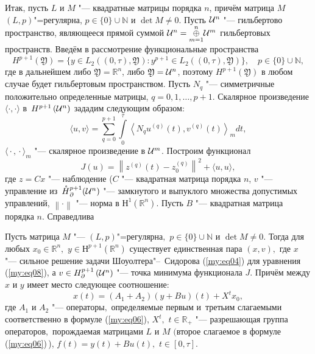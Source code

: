  Итак, пусть $L$ и $M$ "--- квадратные матрицы порядка $n$, причём матрица $M$   $(L,p)$"=регулярна,
$p\in\{0\}\cup{\mathbb N}$ и $\det M\neq 0$. Пусть ${\cal U}^{n}$ "--- гильбертово пространство, являющееся прямой суммой
${\cal U}^{n}=\underset{m=1}{\overset{n}{\oplus}}{\cal U}^{m}$ гильбертовых пространств.
Введём в рассмотрение функциональные пространства
\begin{equation*}
  H^{p+1} \left({\mathfrak Y}\right) = \{ y \in L_{2} \left( \left(0,\tau\right),{\mathfrak Y}\right) :
  y^{p+1} \in L_{2}\left(\left(0,\tau\right),  {\mathfrak Y}\right)\}, \quad p\in\{0\}\cup{\mathbb N},
\end{equation*}
где в дальнейшем либо ${\mathfrak Y}={\mathbb R}^{n}$, либо ${\mathfrak Y}={\cal U}^{n}$, поэтому
$H^{p+1} \left({\mathfrak Y}\right)$ в любом случае будет гильбертовым пространством. 
Пусть $N_{q}$ "--- симметричные положительно определенные матрицы, $q= 0, 1, \ldots , p+1$. 
Скалярное произведение  $\langle \cdot,\cdot\rangle$ в~$H^{p+1} \left({\cal U}^{n} \right)$ зададим следующим образом:
\begin{equation*}
\langle u, v\rangle=\sum\limits^{p+1}_{q=0} \int\limits^{\tau}_{0} \left\langle N_{q} u^{(q)}(t), v^{(q)}(t)\right\rangle_{m} dt,
\end{equation*}
$\langle{}\cdot{}, {}\cdot {}\rangle_{m}$  "--- скалярное произведение в ${\cal U}^{m}$. 
Построим функционал 
\begin{equation*}
J(u)= \left\|z^{(q)}(t) - z^{(q)}_{0}\right\|^{2} + \langle u, u\rangle,
\end{equation*}
где $z=Cx$ "--- наблюдение ($C$ "--- квадратная матрица порядка $n$, $v$ "--- управление из~$\mathring{H}{}^{p+1}_{\partial} ({\cal U}^{n})$ "--- замкнутого и выпуклого множества допустимых управлений,
$\left\| \cdot \right\|$ "--- норма в $Н^{1} \left( {\mathbb R}^{n} \right)$. Пусть $B$ "--- квадратная матрица порядка $n$.
Справедлива 

\smallskip
\hypertarget{svir:th:3}{}
 \begin{theorem}[3]Пусть матрица $M$ "--- $(L,p)$"=регулярна$,$ $p\in\{0\}\cup{\mathbb N}$ и \mbox{$\det M\neq 0$}.
 Тогда для любых $x_{0}\in{\mathbb R}^{n},$  $y \in Н^{p+1} \left( {\mathbb R}^{n} \right)$
 существует единственная пара $(x,v),$ где $x$ "--- сильное решение задачи Шоуолтера"--~Сидорова {\rm(\ref{my:eq04})} для уравнения
 {\rm(\ref{my:eq08}),} а $v\in{H^{p+1}_{\partial}}\left({\cal U}^{n} \right)$ "--- точка минимума функционала $J.$ 
 Причём между  $x$ и $y$ имеет место следующее соотношение:
 \begin{equation*}
 x(t) = \left( A_{1} + A_{2} \right) \left( y+Bu \right) (t) + X^t x_{0},
 \end{equation*}
где $A_{1}$ и $A_{2}$ "--- операторы$,$ определяемые первым и~третьим слагаемыми соответственно в формуле {\rm (\ref{my:eq06}),}
$X^{t}, $ $ t\in{\mathbb R_{+}}$ "--- разрешающая группа операторов$,$ порождаемая матрицами $L$ и $M$ $($второе слагаемое
в формуле {\rm(\ref{my:eq06})\,),} $f(t)=y(t)+Bu(t),$  $t\in \left[ 0, \tau \right].$
\end{theorem}

